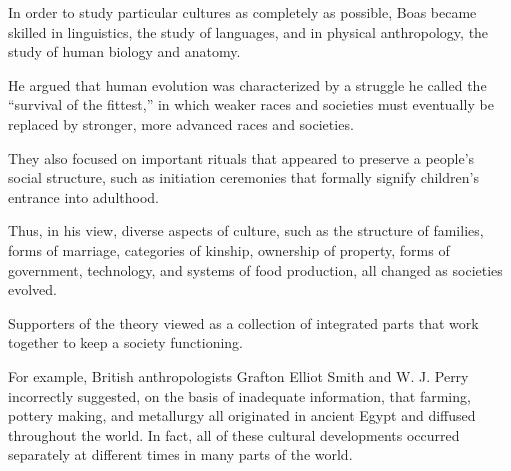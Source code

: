 \qquad [B] In order to study particular cultures as completely as possible, Boas became skilled in linguistics, the study of languages, and in physical anthropology, the study of human biology and anatomy.

\qquad [C] He argued that human evolution was characterized by a struggle he called the “survival of the fittest,” in which weaker races and societies must eventually be replaced by stronger, more advanced races and societies.

\qquad [D] They also focused on important rituals that appeared to preserve a people’s social structure, such as initiation ceremonies that formally signify children’s entrance into adulthood.

\qquad [E] Thus, in his view, diverse aspects of culture, such as the structure of families, forms of marriage, categories of kinship, ownership of property, forms of government, technology, and systems of food production, all changed as societies evolved.

\qquad [F]Supporters of the theory viewed as a collection of integrated parts that work together to keep a society functioning.

\qquad [G] For example, British anthropologists Grafton Elliot Smith and W. J. Perry incorrectly suggested, on the basis of inadequate information, that farming, pottery making, and metallurgy all originated in ancient Egypt and diffused throughout the world. In fact, all of these cultural developments occurred separately at different times in many parts of the world.
